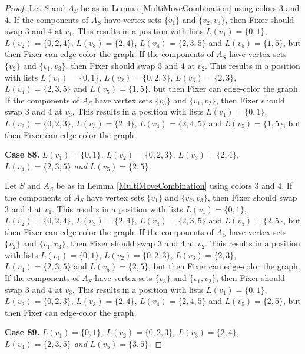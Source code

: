 \documentclass[12pt]{amsart}
\theoremstyle{plain}
\theoremstyle{definition}
\theoremstyle{remark}
\begin{document}
\begin{proof}
Let $S$ and $A_S$ be as in Lemma \ref{MultiMoveCombination} using colors $3$ and $4$. If the components of $A_S$ have vertex sets $\{v_1\}$ and $\{v_2, v_3\}$, then Fixer should swap 3 and 4 at $v_1$. This results in a position with lists $L(v_1) = \{0, 1\}$, $L(v_2) = \{0, 2, 4\}$, $L(v_3) = \{2, 4\}$, $L(v_4) = \{2, 3, 5\}$ and $L(v_5) = \{1, 5\}$, but then Fixer can edge-color the graph.
If the components of $A_S$ have vertex sets $\{v_2\}$ and $\{v_1, v_3\}$, then Fixer should swap 3 and 4 at $v_2$. This results in a position with lists $L(v_1) = \{0, 1\}$, $L(v_2) = \{0, 2, 3\}$, $L(v_3) = \{2, 3\}$, $L(v_4) = \{2, 3, 5\}$ and $L(v_5) = \{1, 5\}$, but then Fixer can edge-color the graph.
If the components of $A_S$ have vertex sets $\{v_3\}$ and $\{v_1, v_2\}$, then Fixer should swap 3 and 4 at $v_3$. This results in a position with lists $L(v_1) = \{0, 1\}$, $L(v_2) = \{0, 2, 3\}$, $L(v_3) = \{2, 4\}$, $L(v_4) = \{2, 4, 5\}$ and $L(v_5) = \{1, 5\}$, but then Fixer can edge-color the graph.

\noindent\textbf{Case 88.  }\textit{$L(v_1) = \{0, 1\}$, $L(v_2) = \{0, 2, 3\}$, $L(v_3) = \{2, 4\}$, $L(v_4) = \{2, 3, 5\}$ and $L(v_5) = \{2, 5\}$.}

Let $S$ and $A_S$ be as in Lemma \ref{MultiMoveCombination} using colors $3$ and $4$. If the components of $A_S$ have vertex sets $\{v_1\}$ and $\{v_2, v_3\}$, then Fixer should swap 3 and 4 at $v_1$. This results in a position with lists $L(v_1) = \{0, 1\}$, $L(v_2) = \{0, 2, 4\}$, $L(v_3) = \{2, 4\}$, $L(v_4) = \{2, 3, 5\}$ and $L(v_5) = \{2, 5\}$, but then Fixer can edge-color the graph.
If the components of $A_S$ have vertex sets $\{v_2\}$ and $\{v_1, v_3\}$, then Fixer should swap 3 and 4 at $v_2$. This results in a position with lists $L(v_1) = \{0, 1\}$, $L(v_2) = \{0, 2, 3\}$, $L(v_3) = \{2, 3\}$, $L(v_4) = \{2, 3, 5\}$ and $L(v_5) = \{2, 5\}$, but then Fixer can edge-color the graph.
If the components of $A_S$ have vertex sets $\{v_3\}$ and $\{v_1, v_2\}$, then Fixer should swap 3 and 4 at $v_3$. This results in a position with lists $L(v_1) = \{0, 1\}$, $L(v_2) = \{0, 2, 3\}$, $L(v_3) = \{2, 4\}$, $L(v_4) = \{2, 4, 5\}$ and $L(v_5) = \{2, 5\}$, but then Fixer can edge-color the graph.

\noindent\textbf{Case 89.  }\textit{$L(v_1) = \{0, 1\}$, $L(v_2) = \{0, 2, 3\}$, $L(v_3) = \{2, 4\}$, $L(v_4) = \{2, 3, 5\}$ and $L(v_5) = \{3, 5\}$.}


\end{proof}
\end{document}
